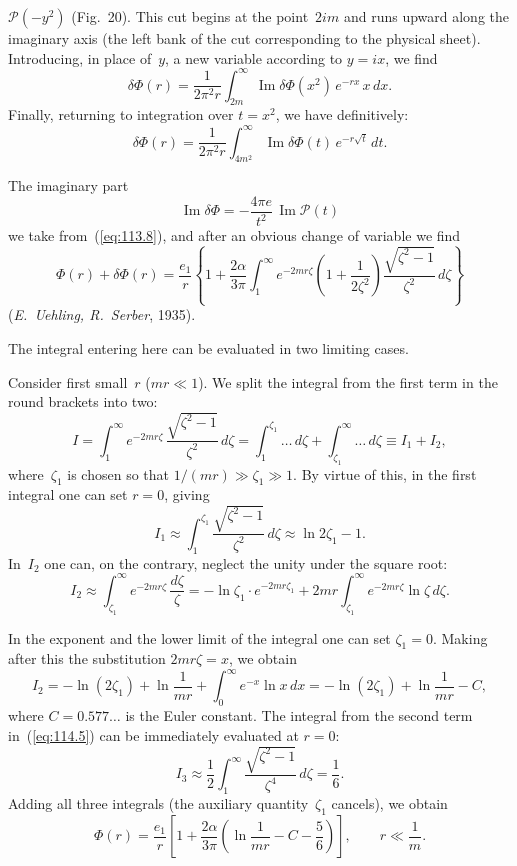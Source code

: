 
\noindent $\mathcal{P}(-y^2)$ (Fig.~20). This cut begins at the point~$2im$ and runs upward along the imaginary axis (the left bank of the cut corresponding to the physical sheet). Introducing, in place of~$y$, a new variable according to $y = ix$, we find
\[
\delta\Phi(r) = \frac{1}{2\pi^2 r}\int_{2m}^{\infty}\operatorname{Im}\delta\Phi(x^2)\,e^{-rx}\,x\,dx.
\]
Finally, returning to integration over $t = x^2$, we have definitively:
\begin{equation}
\delta\Phi(r) = \frac{1}{2\pi^2 r}\int_{4m^2}^{\infty}\operatorname{Im}\delta\Phi(t)\,e^{-r\sqrt{t}}\,dt.
\label{eq:114.4}
\end{equation}

The imaginary part
\[
\operatorname{Im}\delta\Phi = -\frac{4\pi e}{t^2}\,\operatorname{Im}\mathcal{P}(t)
\]
we take from~(\ref{eq:113.8}), and after an obvious change of variable we find
\begin{equation}
\Phi(r) + \delta\Phi(r) = \frac{e_1}{r}\left\{1 + \frac{2\alpha}{3\pi}\int_1^\infty e^{-2mr\zeta}\left(1 + \frac{1}{2\zeta^2}\right)\frac{\sqrt{\zeta^2 - 1}}{\zeta^2}\,d\zeta\right\}
\label{eq:114.5}
\end{equation}
(\emph{E.~Uehling, R.~Serber}, 1935).

The integral entering here can be evaluated in two limiting cases.

Consider first small~$r$ ($mr \ll 1$). We split the integral from the first term in the round brackets into two:
\[
I = \int_1^\infty e^{-2mr\zeta}\,\frac{\sqrt{\zeta^2 - 1}}{\zeta^2}\,d\zeta
= \int_1^{\zeta_1}\ldots\,d\zeta + \int_{\zeta_1}^\infty\ldots\,d\zeta \equiv I_1 + I_2,
\]
where~$\zeta_1$ is chosen so that $1/(mr) \gg \zeta_1 \gg 1$. By virtue of this, in the first integral one can set $r = 0$, giving
\[
I_1 \approx \int_1^{\zeta_1}\frac{\sqrt{\zeta^2 - 1}}{\zeta^2}\,d\zeta \approx \ln 2\zeta_1 - 1.
\]
In~$I_2$ one can, on the contrary, neglect the unity under the square root:
\[
I_2 \approx \int_{\zeta_1}^\infty e^{-2mr\zeta}\,\frac{d\zeta}{\zeta}
= -\ln\zeta_1\cdot e^{-2mr\zeta_1} + 2mr\int_{\zeta_1}^\infty e^{-2mr\zeta}\ln\zeta\,d\zeta.
\]


\noindent In the exponent and the lower limit of the integral one can set $\zeta_1 = 0$. Making after this the substitution $2mr\zeta = x$, we obtain
\[
I_2 = -\ln(2\zeta_1) + \ln\frac{1}{mr} + \int_0^\infty e^{-x}\ln x\,dx
= -\ln(2\zeta_1) + \ln\frac{1}{mr} - C,
\]
where $C = 0.577\ldots$ is the Euler constant. The integral from the second term in~(\ref{eq:114.5}) can be immediately evaluated at $r = 0$:
\[
I_3 \approx \frac{1}{2}\int_1^\infty \frac{\sqrt{\zeta^2 - 1}}{\zeta^4}\,d\zeta = \frac{1}{6}.
\]
Adding all three integrals (the auxiliary quantity~$\zeta_1$ cancels), we obtain
\begin{equation}
\Phi(r) = \frac{e_1}{r}\left[1 + \frac{2\alpha}{3\pi}\left(\ln\frac{1}{mr} - C - \frac{5}{6}\right)\right], \qquad r \ll \frac{1}{m}.
\label{eq:114.6}
\end{equation}


